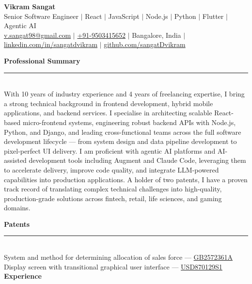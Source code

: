 \documentclass[a4paper,10pt]{article}
\begin{document}
{\centering
  {\LARGE\bfseries Vikram Sangat}\\[3pt]
  {\normalsize Senior Software Engineer $|$ React $|$ JavaScript $|$ Node.js $|$ Python $|$ Flutter $|$ Agentic AI}\\[2pt]
  \small
  \href{mailto:v.sangat98@gmail.com}{v.sangat98@gmail.com} $\mid$
  \href{tel:+91-9503415652}{+91-9503415652} $\mid$
  Bangalore, India $\mid$
  \href{https://www.linkedin.com/in/sangatdvikram/}{linkedin.com/in/sangatdvikram} $\mid$
  \href{https://github.com/sangatDvikram}{github.com/sangatDvikram}
\par}
\vspace{4pt}
\vspace{0.5pt}
{\large\bfseries Professional Summary}\\[-2pt]
\rule{\linewidth}{0.4pt}\\[2pt]
\small With 10 years of industry experience and 4 years of freelancing expertise, I bring a strong technical background in frontend development, hybrid mobile applications, and backend services. I specialise in architecting scalable React-based micro-frontend systems, engineering robust backend APIs with Node.js, Python, and Django, and leading cross-functional teams across the full software development lifecycle — from system design and data pipeline development to pixel-perfect UI delivery. I am proficient with agentic AI platforms and AI-assisted development tools including Augment and Claude Code, leveraging them to accelerate delivery, improve code quality, and integrate LLM-powered capabilities into production applications. A holder of two patents, I have a proven track record of translating complex technical challenges into high-quality, production-grade solutions across fintech, retail, life sciences, and gaming domains.\par\vspace{4pt}
\vspace{0.5pt}
{\large\bfseries Patents}\\[-2pt]
\rule{\linewidth}{0.4pt}\\[2pt]
System and method for determining allocation of sales force --- \href{https://patents.google.com/patent/GB2572361A}{\small GB2572361A}\\[3pt]
Display screen with transitional graphical user interface --- \href{https://patents.google.com/patent/USD870129S1}{\small USD870129S1}\\[3pt]
\vspace{0.5pt}
{\large\bfseries Experience}\\[-2pt]
\end{document}
